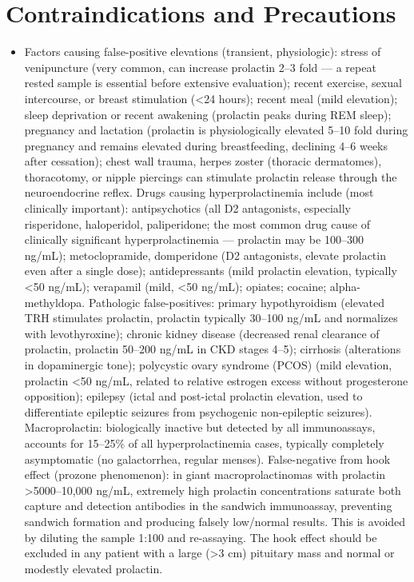 \section*{Contraindications and Precautions}
\begin{itemize}
  \item Factors causing false-positive elevations (transient, physiologic): stress of venipuncture (very common, can increase prolactin 2--3 fold --- a repeat rested sample is essential before extensive evaluation); recent exercise, sexual intercourse, or breast stimulation (<24 hours); recent meal (mild elevation); sleep deprivation or recent awakening (prolactin peaks during REM sleep); pregnancy and lactation (prolactin is physiologically elevated 5--10 fold during pregnancy and remains elevated during breastfeeding, declining 4--6 weeks after cessation); chest wall trauma, herpes zoster (thoracic dermatomes), thoracotomy, or nipple piercings can stimulate prolactin release through the neuroendocrine reflex. Drugs causing hyperprolactinemia include (most clinically important): antipsychotics (all D2 antagonists, especially risperidone, haloperidol, paliperidone; the most common drug cause of clinically significant hyperprolactinemia --- prolactin may be 100--300 ng/mL); metoclopramide, domperidone (D2 antagonists, elevate prolactin even after a single dose); antidepressants (mild prolactin elevation, typically <50 ng/mL); verapamil (mild, <50 ng/mL); opiates; cocaine; alpha-methyldopa. \cite{molitch2008drugs} Pathologic false-positives: primary hypothyroidism (elevated TRH stimulates prolactin, prolactin typically 30--100 ng/mL and normalizes with levothyroxine); chronic kidney disease (decreased renal clearance of prolactin, prolactin 50--200 ng/mL in CKD stages 4--5); cirrhosis (alterations in dopaminergic tone); polycystic ovary syndrome (PCOS) (mild elevation, prolactin <50 ng/mL, related to relative estrogen excess without progesterone opposition); epilepsy (ictal and post-ictal prolactin elevation, used to differentiate epileptic seizures from psychogenic non-epileptic seizures). Macroprolactin: biologically inactive but detected by all immunoassays, accounts for 15--25\% of all hyperprolactinemia cases, typically completely asymptomatic (no galactorrhea, regular menses). False-negative from hook effect (prozone phenomenon): in giant macroprolactinomas with prolactin >5000--10,000 ng/mL, extremely high prolactin concentrations saturate both capture and detection antibodies in the sandwich immunoassay, preventing sandwich formation and producing falsely low/normal results. This is avoided by diluting the sample 1:100 and re-assaying. The hook effect should be excluded in any patient with a large (>3 cm) pituitary mass and normal or modestly elevated prolactin.
\end{itemize}
